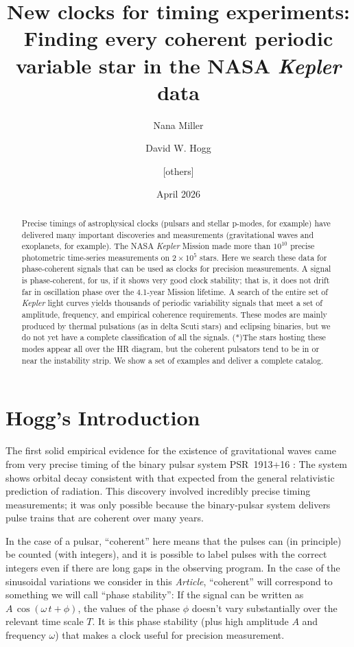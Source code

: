 \documentclass{article}
\title{\bfseries%
New clocks for timing experiments:\\ Finding every coherent periodic variable star in the NASA \textsl{Kepler} data
}
\author{Nana Miller \and David W. Hogg \and [others]}
\date{April 2026}
\newcommand{\documentname}{\textsl{Article}}
\begin{document}
\maketitle

\begin{abstract}\noindent
  Precise timings of astrophysical clocks (pulsars and stellar p-modes, for example) have delivered many important discoveries and measurements (gravitational waves and exoplanets, for example). The NASA \textsl{Kepler} Mission made more than $10^{10}$ precise photometric time-series measurements on  $2\times10^5$ stars.
  Here we search these data for phase-coherent signals that can be used as clocks for precision measurements.
  A signal is phase-coherent, for us, if it shows very good clock stability; that is, it does not drift far in oscillation phase over the 4.1-year Mission lifetime.  
  A search of the entire set of \textsl{Kepler} light curves yields thousands of periodic variability signals that meet a set of amplitude, frequency, and empirical coherence requirements.
  These modes are mainly produced by thermal pulsations (as in delta Scuti stars) and eclipsing binaries, but we do not yet have a complete classification of all the signals.
  (*)The stars hosting these modes appear all over the HR diagram, but the coherent pulsators tend to be in or near the instability strip.
  We show a set of examples and deliver a complete catalog. 
\end{abstract}

\section{Hogg's Introduction}\label{sec:intro}
The first solid empirical evidence for the existence of gravitational waves came from very precise timing of the binary pulsar system PSR~1913+16 \cite{hulsetaylor}:
The system shows orbital decay consistent with that expected from the general relativistic prediction of radiation.
This discovery involved incredibly precise timing measurements; it was only possible because the binary-pulsar system delivers pulse trains that are coherent over many years.

In the case of a pulsar, ``coherent'' here means that the pulses can (in principle) be counted (with integers), and it is possible to label pulses with the correct integers even if there are long gaps in the observing program.
In the case of the sinusoidal variations we consider in this \documentname, 
``coherent'' will correspond to something we will call ``phase stability'':
If the signal can be written as $A\,\cos(\omega\,t+\phi)$, the values of the phase $\phi$ doesn't vary substantially over the relevant time scale $T$.
It is this phase stability (plus high amplitude $A$ and frequency $\omega$) that makes a clock useful for precision measurement.
\end{document}

